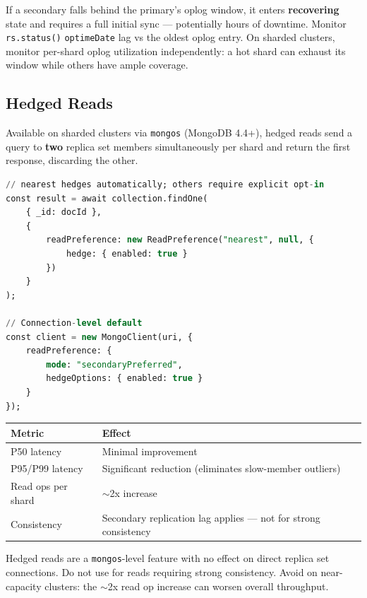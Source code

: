 \documentclass[12pt,a4paper]{article}
\begin{document}
\begin{warnbox}
If a secondary falls behind the primary's oplog window, it enters \textbf{recovering} state and requires a full initial sync --- potentially hours of downtime. Monitor \texttt{rs.status()} \texttt{optimeDate} lag vs the oldest oplog entry. On sharded clusters, monitor per-shard oplog utilization independently: a hot shard can exhaust its window while others have ample coverage.
\end{warnbox}

\subsection{Hedged Reads}

Available on sharded clusters via \texttt{mongos} (MongoDB 4.4+), hedged reads send a query to \textbf{two} replica set members simultaneously per shard and return the first response, discarding the other.

\begin{lstlisting}[language=SQL, caption={Hedged read configuration}]
// nearest hedges automatically; others require explicit opt-in
const result = await collection.findOne(
    { _id: docId },
    {
        readPreference: new ReadPreference("nearest", null, {
            hedge: { enabled: true }
        })
    }
);

// Connection-level default
const client = new MongoClient(uri, {
    readPreference: {
        mode: "secondaryPreferred",
        hedgeOptions: { enabled: true }
    }
});
\end{lstlisting}

\begin{center}
\begin{tabular}{ll}
\toprule
\textbf{Metric} & \textbf{Effect} \\
\midrule
P50 latency & Minimal improvement \\
P95/P99 latency & Significant reduction (eliminates slow-member outliers) \\
Read ops per shard & $\sim$2x increase \\
Consistency & Secondary replication lag applies --- not for strong consistency \\
\bottomrule
\end{tabular}
\end{center}

\begin{warnbox}
Hedged reads are a \texttt{mongos}-level feature with no effect on direct replica set connections. Do not use for reads requiring strong consistency. Avoid on near-capacity clusters: the $\sim$2x read op increase can worsen overall throughput.
\end{warnbox}
\end{document}
